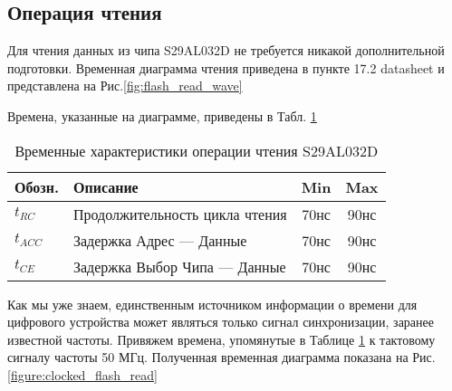 \documentclass[a5paper, DIV=14, headings=openany, twoside=true,fontsize=10pt, titlepage]{scrreprt}
\newcommand{\eng}[1]{\foreignlanguage{english}{#1}}
\begin{document}
\subsection{Операция чтения}
\par{Для чтения данных из чипа \eng{S29AL032D} не требуется никакой дополнительной подготовки. Временная диаграмма чтения приведена в пункте 17.2 \eng{datasheet} и представлена на Рис.\ref{fig:flash_read_wave}}

% 

\par{Времена, указанные на диаграмме, приведены в Табл. \ref{table:flash_read_timings}}

\begin{table}[htbp]
  \centering
  \small
  \begin{tabular}{l|l|c|c}
    Обозн. & Описание & Min & Max \\
    \hline
    $t_{RC}$ & Продолжительность цикла чтения & 70нс & 90нс\\
    $t_{ACC}$ & Задержка Адрес --- Данные & 70нс & 90нс\\
    $t_{CE}$ & Задержка Выбор Чипа --- Данные & 70нс & 90нс\\
  \end{tabular}
  \caption{Временные характеристики операции чтения \eng{S29AL032D}}
  \label{table:flash_read_timings}
\end{table}

\par{Как мы уже знаем, единственным источником информации о времени для цифрового устройства может являться только сигнал синхронизации, заранее известной частоты. Привяжем времена, упомянутые в Таблице \ref{table:flash_read_timings} к тактовому сигналу частоты 50 МГц. Полученная временная диаграмма показана на Рис. \ref{figure:clocked_flash_read}}
\end{document}
